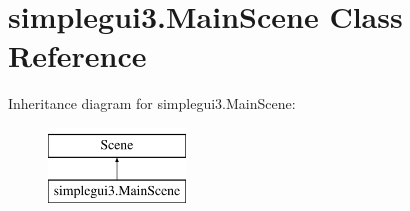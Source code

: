 \hypertarget{classsimplegui3_1_1_main_scene}{\section{simplegui3.\-Main\-Scene Class Reference}
\label{classsimplegui3_1_1_main_scene}
}
Inheritance diagram for simplegui3.\-Main\-Scene\-:\begin{figure}[H]
\begin{center}
\leavevmode
\includegraphics[height=2.000000cm]{classsimplegui3_1_1_main_scene}
\end{center}
\end{figure}
